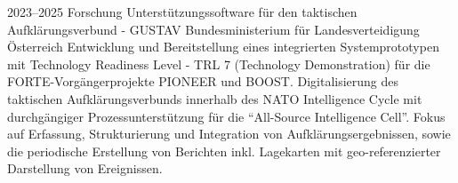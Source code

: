 \cventry
{2023--2025}
{Forschung}
{Unterstützungssoftware für den taktischen Aufklärungsverbund - GUSTAV}
{Bundesministerium für Landesverteidigung}
{Österreich}
{
  Entwicklung und Bereitstellung eines integrierten Systemprototypen mit
  Technology Readiness Level - TRL 7 (Technology Demonstration) für die FORTE-Vorgängerprojekte PIONEER und BOOST.
  Digitalisierung des taktischen Aufklärungsverbunds innerhalb des NATO Intelligence Cycle
  mit durchgängiger Prozessunterstützung für die ``All-Source Intelligence Cell''.
  Fokus auf Erfassung, Strukturierung und Integration von Aufklärungsergebnissen, sowie die periodische Erstellung
  von Berichten inkl. Lagekarten mit geo-referenzierter Darstellung von Ereignissen.
}
